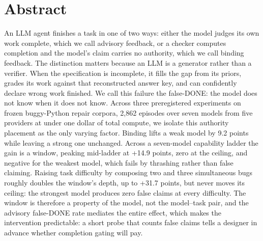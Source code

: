 \section*{\centering Abstract}

\noindent An LLM agent finishes a task in one of two ways: either the model judges its own work complete, which we call advisory feedback, or a checker computes completion and the model's claim carries no authority, which we call binding feedback. The distinction matters because an LLM is a generator rather than a verifier. When the specification is incomplete, it fills the gap from its priors, grades its work against that reconstructed answer key, and can confidently declare wrong work finished. We call this failure the false-DONE: the model does not know when it does not know. Across three preregistered experiments on frozen buggy-Python repair corpora, 2,862 episodes over seven models from five providers at under one dollar of total compute, we isolate this authority placement as the only varying factor. Binding lifts a weak model by 9.2 points while leaving a strong one unchanged. Across a seven-model capability ladder the gain is a window, peaking mid-ladder at +14.9 points, zero at the ceiling, and negative for the weakest model, which fails by thrashing rather than false claiming. Raising task difficulty by composing two and three simultaneous bugs roughly doubles the window's depth, up to +31.7 points, but never moves its ceiling: the strongest model produces zero false claims at every difficulty. The window is therefore a property of the model, not the model--task pair, and the advisory false-DONE rate mediates the entire effect, which makes the intervention predictable: a short probe that counts false claims tells a designer in advance whether completion gating will pay.

